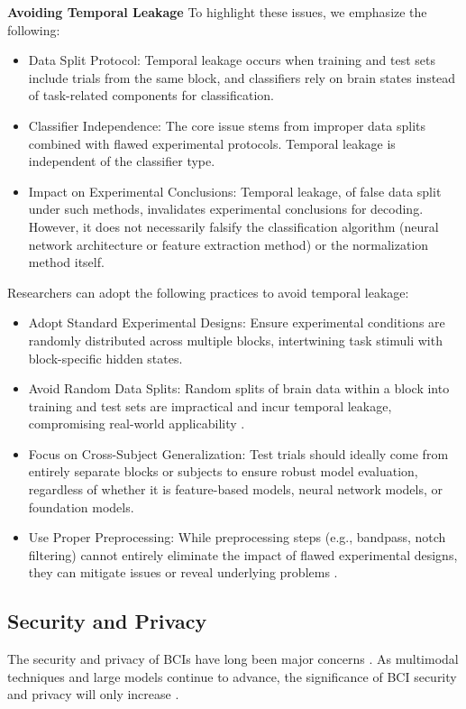 \documentclass[journal]{IEEEtran}
\begin{document}
\textbf{Avoiding Temporal Leakage} To highlight these issues, we emphasize the following:
\begin{itemize}
\item Data Split Protocol: Temporal leakage occurs when training and test sets include trials from the same block, and classifiers rely on brain states instead of task-related components for classification.
\item Classifier Independence: The core issue stems from improper data splits combined with flawed experimental protocols. Temporal leakage is independent of the classifier type.
\item Impact on Experimental Conclusions: Temporal leakage, of false data split under such methods, invalidates experimental conclusions for decoding. However, it does not necessarily falsify the classification algorithm (neural network architecture or feature extraction method) or the normalization method itself.
\end{itemize}

Researchers can adopt the following practices to avoid temporal leakage:
\begin{itemize}
\item Adopt Standard Experimental Designs: Ensure experimental conditions are randomly distributed across multiple blocks, intertwining task stimuli with block-specific hidden states.
\item Avoid Random Data Splits: Random splits of brain data within a block into training and test sets are impractical and incur temporal leakage, compromising real-world applicability \cite{Kapoor2023}.
\item Focus on Cross-Subject Generalization: Test trials should ideally come from entirely separate blocks or subjects to ensure robust model evaluation, regardless of whether it is feature-based models, neural network models, or foundation models.
\item Use Proper Preprocessing: While preprocessing steps (e.g., bandpass, notch filtering) cannot entirely eliminate the impact of flawed experimental designs, they can mitigate issues or reveal underlying problems \cite{Li2021}.
\end{itemize}

\subsection{Security and Privacy} \label{sect:securityandprivacy}

The security and privacy of BCIs have long been major concerns \cite{Ienca2018}. As multimodal techniques and large models continue to advance, the significance of BCI security and privacy will only increase \cite{Turchet2024, Magee2024}.
\end{document}
